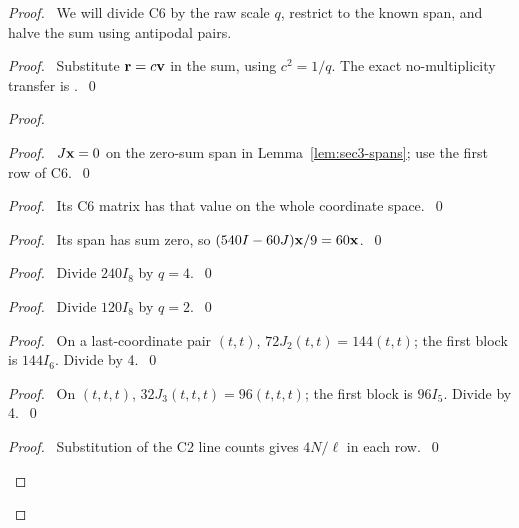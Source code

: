 \begin{proof}
 \pfsketch\ We will divide C6 by the raw scale $q$, restrict to the known span,
 and halve the sum using antipodal pairs.
 \begin{proof}\pf\ Substitute ${\mathbf r}=c{\mathbf v}$ in the sum, using $c^2=1/q$.
  The exact no-multiplicity transfer is .~\qed\end{proof}
 \begin{proof}
  \begin{proof}\pf\ $J{\mathbf x}=0$ on the zero-sum span in Lemma~\ref{lem:sec3-spans};
   use the first row of C6.~\qed\end{proof}
  \begin{proof}\pf\ Its C6 matrix has that value on the whole coordinate space.~\qed\end{proof}
  \begin{proof}\pf\ Its span has sum zero, so $(540I-60J){\mathbf x}/9=60{\mathbf x}$.~\qed\end{proof}
  \begin{proof}\pf\ Divide $240I_8$ by $q=4$.~\qed\end{proof}
  \begin{proof}\pf\ Divide $120I_8$ by $q=2$.~\qed\end{proof}
  \begin{proof}\pf\ On a last-coordinate pair $(t,t)$, $72J_2(t,t)=144(t,t)$;
   the first block is $144I_6$. Divide by 4.~\qed\end{proof}
  \begin{proof}\pf\ On $(t,t,t)$, $32J_3(t,t,t)=96(t,t,t)$;
   the first block is $96I_5$. Divide by 4.~\qed\end{proof}
  \qedstep
  \begin{proof}\pf\ Substitution of the C2 line counts gives $4N/\ell$ in each row.~\qed\end{proof}
 \end{proof}

\end{proof}
